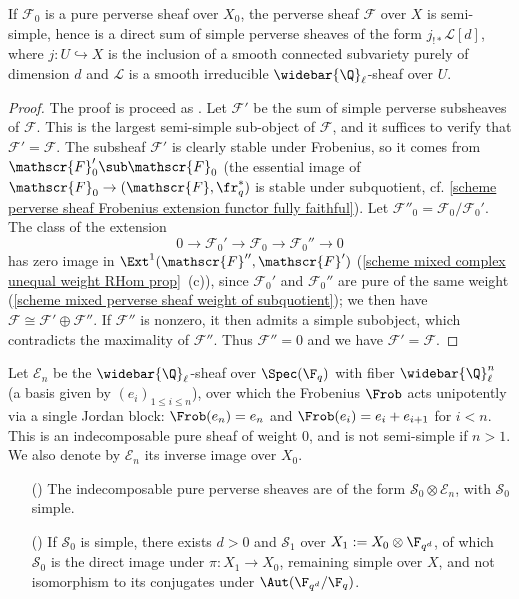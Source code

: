 \begin{theorem}\label{scheme pure perverse sheaf semisimple}
If $\mathscr{F}_0$ is a pure perverse sheaf over $X_0$, the perverse sheaf $\mathscr{F}$ over $X$ is semi-simple, hence is a direct sum of simple perverse sheaves of the form $j_{!*}\mathscr{L}[d]$, where $j:U\hookrightarrow X$ is the inclusion of a smooth connected subvariety purely of dimension $d$ and $\mathscr{L}$ is a smooth irreducible $\widebar{\Q}_\ell$-sheaf over $U$.
\end{theorem}
\begin{proof}
The proof is proceed as \cite[3.4.1~(iii)]{Deligne_WeilII}. Let $\mathscr{F}'$ be the sum of simple perverse subsheaves of $\mathscr{F}$. This is the largest semi-simple sub-object of $\mathscr{F}$, and it suffices to verify that $\mathscr{F}'=\mathscr{F}$. The subsheaf $\mathscr{F}'$ is clearly stable under Frobenius, so it comes from $\mathscr{F}'_0\sub\mathscr{F}_0$ (the essential image of $\mathscr{F}_0\to(\mathscr{F},\fr_q^*)$ is stable under subquotient, cf. \cref{scheme perverse sheaf Frobenius extension functor fully faithful}). Let $\mathscr{F}''_0=\mathscr{F}_0/\mathscr{F}_0'$. The class of the extension
\[0\to\mathscr{F}_0'\to\mathscr{F}_0\to\mathscr{F}_0''\to 0\]
has zero image in $\Ext^1(\mathscr{F}'',\mathscr{F}')$ (\cref{scheme mixed complex unequal weight RHom prop}~(c)), since $\mathscr{F}_0'$ and $\mathscr{F}_0''$ are pure of the same weight (\cref{scheme mixed perverse sheaf weight of subquotient}); we then have $\mathscr{F}\cong\mathscr{F}'\oplus\mathscr{F}''$. If $\mathscr{F}''$ is nonzero, it then admits a simple subobject, which contradicts the maximality of $\mathscr{F}''$. Thus $\mathscr{F}''=0$ and we have $\mathscr{F}'=\mathscr{F}$.
\end{proof}

Let $\mathscr{E}_n$ be the $\widebar{\Q}_\ell$-sheaf over $\Spec(\F_q)$ with fiber $\widebar{\Q}_\ell^n$ (a basis given by $(e_i)_{1\leq i\leq n}$), over which the Frobenius $\Frob$ acts unipotently via a single Jordan block: $\Frob(e_n)=e_n$ and $\Frob(e_i)=e_i+e_{i+1}$ for $i<n$. This is an indecomposable pure sheaf of weight $0$, and is not semi-simple if $n>1$. We also denote by $\mathscr{E}_n$ its inverse image over $X_0$.

\begin{proposition}\label{scheme indecomposable pure perverse char}
\begin{enumerate}
    \item[(\rmnum{1})] The indecomposable pure perverse sheaves are of the form $\mathscr{S}_0\otimes\mathscr{E}_n$, with $\mathscr{S}_0$ simple.
    \item[(\rmnum{2})] If $\mathscr{S}_0$ is simple, there exists $d>0$ and $\mathscr{S}_1$ over $X_1:=X_0\otimes\F_{q^d}$, of which $\mathscr{S}_0$ is the direct image under $\pi:X_1\to X_0$, remaining simple over $X$, and not isomorphism to its conjugates under $\Aut(\F_{q^d}/\F_q)$.
\end{enumerate}
\end{proposition}

